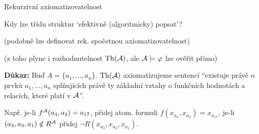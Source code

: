 \documentclass{beamer}
\begin{document}
\begin{frame}{Rekurzivní axiomatizovatelnost}

    \pause
    Kdy lze třídu struktur `efektivně (algoritmicky) popsat'?

    \pause

    \pause
    (podobně lze definovat \alert{rek. spočetnou axiomatizovatelnost})

    \pause
        
    \pause
    (z toho plyne i rozhodnutelnost $\operatorname{Th}(\mathcal{A})$, ale $\mathcal{A}\models\varphi$ lze ověřit přímo)

    \pause
    \textbf{Důkaz:} \pause
    Buď $A=\{a_1,\dots,a_n\}$. $\operatorname{Th}(\mathcal{A})$ axiomatizujeme sentencí ``existuje právě $n$ prvků $a_1,\dots,a_n$ splňujících právě ty \alert{základní vztahy} o funkčních hodnotách a relacích, které platí v $\mathcal{A}$''.
    
    \pause
    Např. je-li $f^{\mathcal{A}}(a_4, a_2)=a_{17}$, přidej atom. formuli $f(x_{a_4},x_{a_2})=x_{a_{17}}$, je-li $(a_3,a_3,a_1)\notin R^{\mathcal{A}}$ přidej $\neg R(x_{a_3},x_{a_3},x_{a_1})$.\hfill\qedsymbol

\end{frame}
\end{document}
